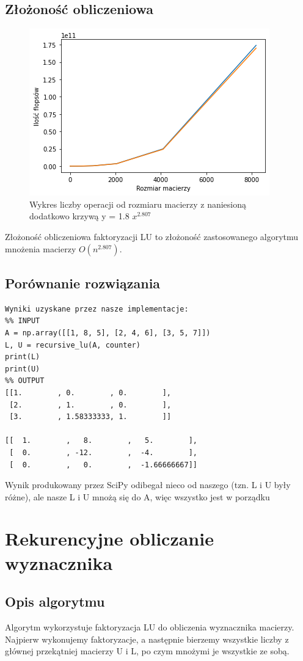 \documentclass{article}
\begin{document}
\subsection{Złożoność obliczeniowa}

\begin{figure}[H]
    \centering
    \includegraphics[width=0.6\linewidth]{img/lu_complexity.png}
    \caption{Wykres liczby operacji od rozmiaru macierzy z naniesioną dodatkowo krzywą y = 1.8 $x^{2.807}$}
\end{figure}


\qquad Złożoność obliczeniowa faktoryzacji LU to złożoność 
zastosowanego algorytmu mnożenia macierzy $O(n^{2.807})$.

\subsection{Porównanie rozwiązania}
\begin{lstlisting}
Wyniki uzyskane przez nasze implementacje:
%% INPUT
A = np.array([[1, 8, 5], [2, 4, 6], [3, 5, 7]])
L, U = recursive_lu(A, counter)
print(L)
print(U)
%% OUTPUT
[[1.        , 0.        , 0.        ],
 [2.        , 1.        , 0.        ],
 [3.        , 1.58333333, 1.        ]]

[[  1.        ,   8.        ,   5.        ],
 [  0.        , -12.        ,  -4.        ],
 [  0.        ,   0.        ,  -1.66666667]]
\end{lstlisting} 

Wynik produkowany przez SciPy odibegał nieco od naszego (tzn. L i U były różne),
ale nasze L i U mnożą się do A, więc wszystko jest w porządku

\section{Rekurencyjne obliczanie wyznacznika}

\subsection{Opis algorytmu}
\qquad Algorytm wykorzystuje faktoryzacja LU do obliczenia wyznacznika macierzy. Najpierw wykonujemy faktoryzacje, a następnie bierzemy wszystkie liczby z głównej przekątniej macierzy U i L, po czym mnożymi je wszystkie ze sobą. \\
\end{document}
